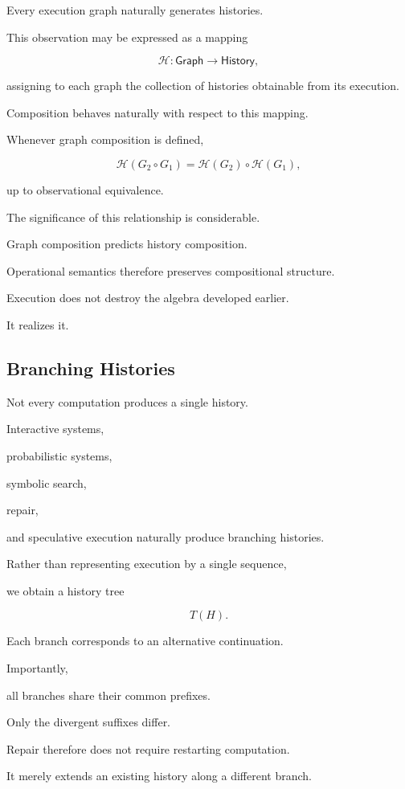 \documentclass[12pt,oneside]{article}
\begin{document}
Every execution graph naturally generates histories.

This observation may be expressed as a mapping

\[
\mathcal H
:
\mathsf{Graph}
\longrightarrow
\mathsf{History},
\]

assigning to each graph the collection of histories obtainable from its execution.

Composition behaves naturally with respect to this mapping.

Whenever graph composition is defined,

\[
\mathcal H(G_2\circ G_1)
=
\mathcal H(G_2)
\circ
\mathcal H(G_1),
\]

up to observational equivalence.

The significance of this relationship is considerable.

Graph composition predicts history composition.

Operational semantics therefore preserves compositional structure.

Execution does not destroy the algebra developed earlier.

It realizes it.

\subsection{Branching Histories}

Not every computation produces a single history.

Interactive systems,

probabilistic systems,

symbolic search,

repair,

and speculative execution naturally produce branching histories.

Rather than representing execution by a single sequence,

we obtain a history tree

\[
T(H).
\]

Each branch corresponds to an alternative continuation.

Importantly,

all branches share their common prefixes.

Only the divergent suffixes differ.

Repair therefore does not require restarting computation.

It merely extends an existing history along a different branch.
\end{document}
